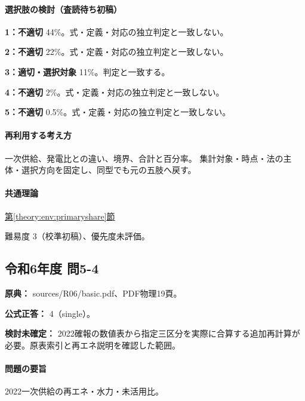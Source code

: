 \paragraph{選択肢の検討（査読待ち初稿）}\mbox{}\par

\noindent\textbf{1：不適切} 44\%。式・定義・対応の独立判定と一致しない。\par

\noindent\textbf{2：不適切} 22\%。式・定義・対応の独立判定と一致しない。\par

\noindent\textbf{3：適切・選択対象} 11\%。判定と一致する。\par

\noindent\textbf{4：不適切} 2\%。式・定義・対応の独立判定と一致しない。\par

\noindent\textbf{5：不適切} 0.5\%。式・定義・対応の独立判定と一致しない。\par

\paragraph{再利用する考え方} 一次供給、発電比との違い、境界、合計と百分率。 集計対象・時点・法の主体・選択方向を固定し、同型でも元の五肢へ戻す。

\paragraph{共通理論} \hyperref[theory:env:primaryshare]{第\ref*{theory:env:primaryshare}節}

\par 難易度 3（校準初稿）、優先度未評価。

\subsection{令和6年度 問5-4}
\label{q:r06-reg-basic-5-4}

\noindent\textbf{原典：} sources/R06/basic.pdf、PDF物理19頁。

\textbf{公式正答：} 4（single）。

\par\textbf{検討未確定：} 2022確報の数値表から指定三区分を実際に合算する追加再計算が必要。原表索引と再エネ説明を確認した範囲。

\paragraph{問題の要旨} 2022一次供給の再エネ・水力・未活用比。

